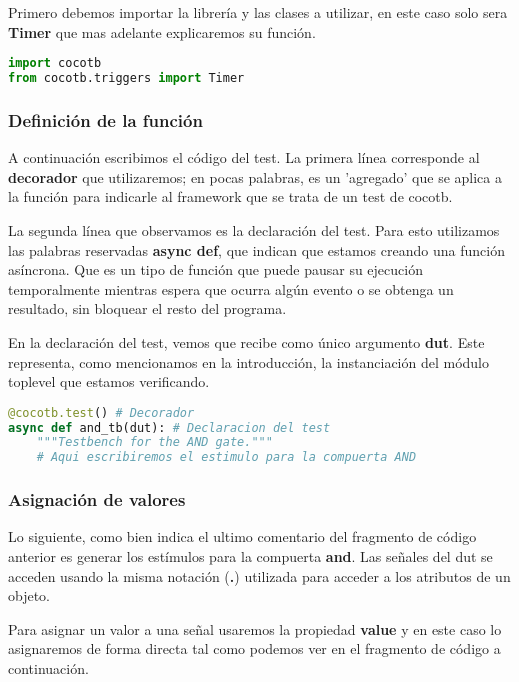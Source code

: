 \documentclass[a4paper,12pt]{article}
\begin{document}
Primero debemos importar la librería y las clases a utilizar, en este caso solo sera \textbf{Timer} que mas adelante explicaremos su función.

\begin{lstlisting}[language=Python, caption=and\_tb.py, frame=lines]
import cocotb
from cocotb.triggers import Timer
\end{lstlisting}

\subsubsection{Definición de la función}

A continuación escribimos el código del test. La primera línea corresponde al \textbf{decorador}  que utilizaremos; en pocas palabras, es un 'agregado' que se aplica a la función para indicarle al framework que se trata de un test de cocotb.

La segunda línea que observamos es la declaración del test. Para esto utilizamos las palabras reservadas \textbf{async def}, que indican que estamos creando una función asíncrona. Que es un tipo de función que puede pausar su ejecución temporalmente mientras espera que ocurra algún evento o se obtenga un resultado, sin bloquear el resto del programa.

En la declaración del test, vemos que recibe como único argumento \textbf{dut}. Este representa, como mencionamos en la introducción, la instanciación del módulo toplevel que estamos verificando.

\begin{lstlisting}[language=Python, caption=and\_tb.py, frame=lines]
@cocotb.test() # Decorador
async def and_tb(dut): # Declaracion del test
	"""Testbench for the AND gate."""
	# Aqui escribiremos el estimulo para la compuerta AND
\end{lstlisting}

\subsubsection{Asignación de valores}
Lo siguiente, como bien indica el ultimo comentario del fragmento de código anterior es generar los estímulos para la compuerta \textbf{and}. Las señales del dut se acceden usando la misma notación (\textbf{.}) utilizada para acceder a los atributos de un objeto.

Para asignar un valor a una señal usaremos la propiedad \textbf{value} y en este caso lo asignaremos de forma directa tal como podemos ver en el fragmento de código a continuación.
\end{document}
